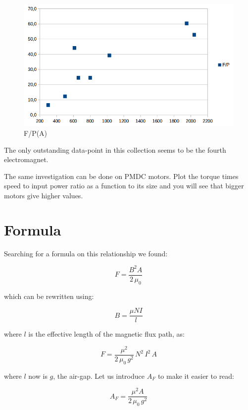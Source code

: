 \documentclass[]{../common/elementary-physics}
\begin{document}
\begin{figure}[ht] \centering
	\includegraphics[scale=.4]{fp-of-a-2} \caption{F/P(A)}
\end{figure}

The only outstanding data-point in this collection seems to be the fourth electromagnet.

The same investigation can be done on PMDC motors.
Plot the torque times speed to input power ratio as a function to its size and you will see that bigger motors give higher values.

\section{Formula}

Searching for a formula on this relationship we found\cite{wpele,gbet}:

\begin{equation}
F = \frac{B^2 A}{2 \, \mu_0}
\end{equation}

which can be rewritten using:

\begin{equation}
B = \frac{\mu N I}{l}
\end{equation}

where $l$ is the effective length of the magnetic flux path, as\cite{wpele}:

\begin{equation}
F = \frac{\mu^2}{2 \, \mu_0 \, g^2} \, N^2 \, I^2 \, A
\end{equation}

where $l$ now is $g$, the air-gap.
Let us introduce $A_F$ to make it easier to read:

\begin{equation}
A_F = \frac{\mu^2 A}{2 \, \mu_0 \, g^2}
\end{equation}
\end{document}
